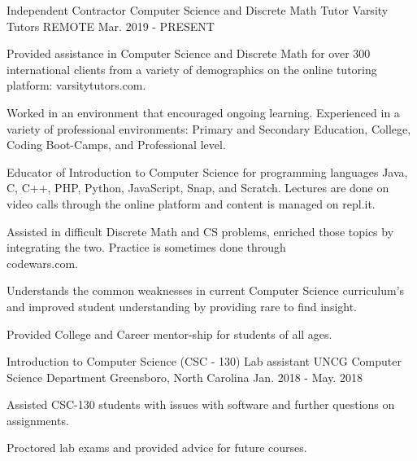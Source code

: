 \begin{cventries}
  \cventry
    {Independent Contractor Computer Science and Discrete Math Tutor} %
    {Varsity Tutors} %
    {REMOTE} %
    {Mar. 2019 - PRESENT} %
    {
      \begin{cvitems} %
        \item {Provided assistance in Computer Science and Discrete Math for over 300 international clients from a variety of demographics on the online tutoring platform: varsitytutors.com.}
        \item {Worked in an environment that encouraged ongoing learning. Experienced in a variety of professional environments: Primary and Secondary Education, College, Coding Boot-Camps, and Professional level.}
        \item {Educator of Introduction to Computer Science for programming languages Java, C, C++, PHP, Python, JavaScript, Snap, and Scratch. Lectures are done on video calls through the online platform and content is managed on repl.it.}
        \item {Assisted in difficult Discrete Math and CS problems, enriched those topics by integrating the two. Practice is sometimes done through\\codewars.com.}
        \item {Understands the common weaknesses in current Computer Science curriculum's and improved student understanding by providing rare to find insight.}
        \item {Provided College and Career mentor-ship for students of all ages.}
      \end{cvitems}
    }

  \cventry
    {Introduction to Computer Science (CSC - 130) Lab assistant} %
    {UNCG Computer Science Department} %
    {Greensboro, North Carolina} %
    {Jan. 2018 - May. 2018} %
    {
      \begin{cvitems} %
        \item {Assisted CSC-130 students with issues with software and further questions on assignments.}
        \item {Proctored lab exams and provided advice for future courses.}
      \end{cvitems}
    }



\end{cventries}

